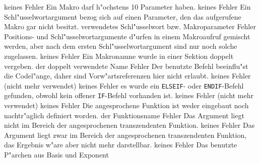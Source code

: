 \documentclass[12pt,a4paper,twoside]{report}
\newcommand{\tty}[1]{{\tt #1}}
\begin{document}
\begin{description}
               {keines}
               {Fehler}
               {Ein Makro darf h"ochstens 10 Parameter haben.}
               {keines}
               {Fehler}
               {Ein Schl"usselwortargument bezog sich auf einen
                Parameter, den das aufgerufene Makro gar nicht
                besitzt.}
               {verwendetes Schl"usselwort bzw. Makroparameter}
               {Fehler}
               {Positions- und Schl"usselwortargumente d"urfen in
                einem Makroaufruf gemischt werden, aber nach dem
                ersten Schl"usselwortargument sind nur noch
                solche zugelassen.}
               {keines}
               {Fehler}
               {Ein Makronamne wurde in einer Sektion doppelt
                vergeben.}
               {der doppelt verwendete Name}
               {Fehler}
               {Der benutzte Befehl beeinflu"st die Codel"ange,
                daher sind Vorw"artsreferenzen hier nicht erlaubt.}
               {keines}
               {Fehler}
               {(nicht mehr verwendet)}
               {keines}
               {Fehler}
               {es wurde ein \tty{ELSEIF}- oder \tty{ENDIF}-Befehl gefunden,
                obwohl kein offener \tty{IF}-Befehl vorhanden ist.}
               {keines}
               {Fehler}
               {(nicht mehr verwendet)}
               {keines}
               {Fehler}
               {Die angesprochene Funktion ist weder eingebaut
                noch nachtr"aglich definiert worden.}
               {der Funktionsname}
               {Fehler}
               {Das Argument liegt nicht im Bereich der
                angesprochenen transzendenten Funktion.}
               {keines}
               {Fehler}
               {Das Argument liegt zwar im Bereich der
                angesprochenen transzendenten Funktion, das Ergebnis
                w"are aber nicht mehr darstellbar.}
               {keines}
               {Fehler}
               {Das benutzte P"archen aus Basis und Exponent
}
\end{description}
\end{document}
